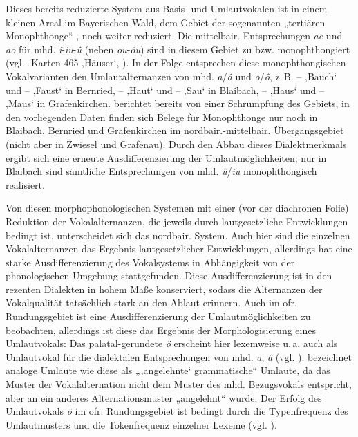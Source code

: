 Dieses bereits reduzierte System aus Basis- und Umlautvokalen ist in einem kleinen Areal im Bayerischen Wald, dem Gebiet der sogenannten „tertiären Monophthonge“ \citep{Wildfeuer2004}, noch weiter reduziert. Die mittelbair. Entsprechungen \textit{ae} und \textit{ao} für mhd. \textit{î}{}-\textit{iu}{}-\textit{û} (neben \textit{ou}{}-\textit{öu}) sind in diesem Gebiet zu  bzw.  monophthongiert (vgl. \citealt{WA}-Karten 465 ‚Häuser‘, \citealt[Karte 18/19]{RennKönig2006}). In der Folge entsprechen diese monophthongischen Vokalvarianten den Umlautalternanzen von mhd. \textit{a}/\textit{â} und \textit{o}/\textit{ô}, z.\,B.  --  ‚Bauch‘ und  -- \linebreak{} ‚Faust‘ in Bernried,  --  ‚Haut‘ und  --  ‚Sau‘ in Blaibach,   --   ‚Haus‘ und  --  ‚Maus‘ in Grafenkirchen. \citet[136]{Wildfeuer2004} berichtet bereits von einer Schrumpfung des Gebiets, in den vorliegenden Daten finden sich Belege für Monophthonge nur noch in Blaibach, Bernried und Grafenkirchen im nordbair.-mittelbair. Übergangsgebiet (nicht aber in Zwiesel und Grafenau). Durch den Abbau dieses Dialektmerkmals ergibt sich eine erneute Ausdifferenzierung der Umlautmöglichkeiten; nur in Blaibach sind sämtliche Entsprechungen von mhd. \textit{û}/\textit{iu} monophthongisch realisiert.

Von diesen morphophonologischen Systemen mit einer (vor der diachronen Folie) Reduktion der Vokalalternanzen, die jeweils durch lautgesetzliche Entwicklungen bedingt ist, unterscheidet sich das nordbair. System. Auch hier sind die einzelnen Vokalalternanzen das Ergebnis lautgesetzlicher Entwicklungen, allerdings hat eine starke Ausdifferenzierung des Vokalsystems in Abhängigkeit von der phonologischen Umgebung stattgefunden. Diese Ausdifferenzierung ist in den rezenten Dialekten in hohem Maße konserviert, sodass die Alternanzen der Vokalqualität tatsächlich stark an den Ablaut erinnern. Auch im ofr. Rundungsgebiet ist eine Ausdifferenzierung der Umlautmöglichkeiten zu beobachten, allerdings ist diese das Ergebnis der Morphologisierung eines Umlautvokals: Das palatal-gerundete \textit{ö} erscheint hier lexemweise u.\,a. auch als Umlautvokal für die dialektalen Entsprechungen von mhd. \textit{a}, \textit{â} (vgl. \citealt[61]{Rowley1997}). \citet[200]{Schirmunski1962} bezeichnet analoge Umlaute wie diese als „‚angelehnte‘ grammatische“ Umlaute, da das Muster der Vokalalternation nicht dem Muster des mhd. Bezugsvokals entspricht, aber an ein anderes Alternationsmuster „angelehnt“ wurde. Der Erfolg des Umlautvokals \textit{ö} im ofr. Rundungsgebiet ist bedingt durch die Typenfrequenz des Umlautmusters und die Tokenfrequenz einzelner Lexeme (vgl. \citealt[120--121]{Rowley1997}).

